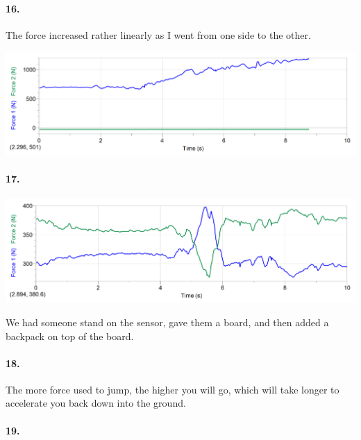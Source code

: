        \paragraph*{16.}
    
        \begin{mdframed}
            The force increased rather linearly as I went from one side to the other.

            \includegraphics[width=\textwidth]{image12.png} 
        \end{mdframed}

        \paragraph*{17.}

        \begin{mdframed}
            \includegraphics[width=\textwidth]{image17.png} 

            We had someone stand on the sensor, gave them a board, and then added a backpack on top of the board.
        \end{mdframed}

        \paragraph*{18.}

        \begin{mdframed}
            The more force used to jump, the higher you will go, which will take longer to accelerate you back down into the ground.
        \end{mdframed}

        \paragraph*{19.}

